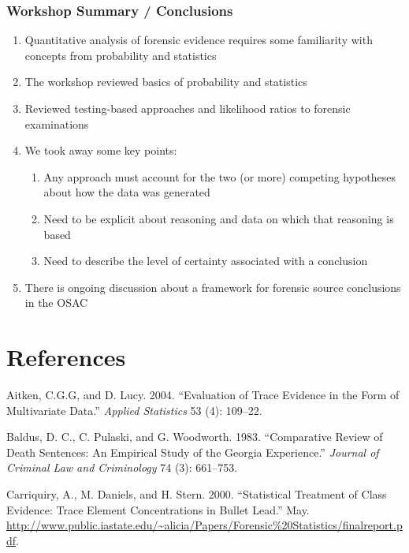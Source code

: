 \documentclass[]{book}
\providecommand{\tightlist}{%
  \setlength{\itemsep}{0pt}\setlength{\parskip}{0pt}}
\theoremstyle{definition}
\theoremstyle{definition}
\theoremstyle{remark}
\begin{document}
\subsection{Workshop Summary /
Conclusions}\label{workshop-summary-conclusions}

\begin{enumerate}
\def\labelenumi{\arabic{enumi}.}
\tightlist
\item
  Quantitative analysis of forensic evidence requires some familiarity
  with concepts from probability and statistics
\item
  The workshop reviewed basics of probability and statistics
\item
  Reviewed testing-based approaches and likelihood ratios to forensic
  examinations
\item
  We took away some key points:

  \begin{enumerate}
  \def\labelenumii{\alph{enumii}.}
  \tightlist
  \item
    Any approach must account for the two (or more) competing hypotheses
    about how the data was generated
  \item
    Need to be explicit about reasoning and data on which that reasoning
    is based
  \item
    Need to describe the level of certainty associated with a conclusion
  \end{enumerate}
\item
  There is ongoing discussion about a framework for forensic source
  conclusions in the OSAC
\end{enumerate}

\chapter*{References}\label{references}

\hypertarget{refs}{}
\hypertarget{ref-aitkenlucy}{}
Aitken, C.G.G, and D. Lucy. 2004. ``Evaluation of Trace Evidence in the
Form of Multivariate Data.'' \emph{Applied Statistics} 53 (4): 109--22.

\hypertarget{ref-baldus}{}
Baldus, D. C., C. Pulaski, and G. Woodworth. 1983. ``Comparative Review
of Death Sentences: An Empirical Study of the Georgia Experience.''
\emph{Journal of Criminal Law and Criminology} 74 (3): 661--753.

\hypertarget{ref-aliciaetal}{}
Carriquiry, A., M. Daniels, and H. Stern. 2000. ``Statistical Treatment
of Class Evidence: Trace Element Concentrations in Bullet Lead.'' May.
\url{http://www.public.iastate.edu/~alicia/Papers/Forensic\%20Statistics/finalreport.pdf}.
\end{document}
